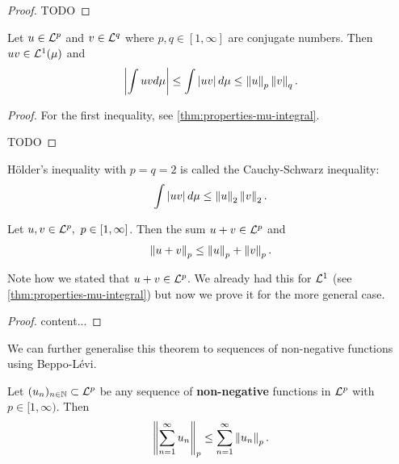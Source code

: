 \begin{proof}
	TODO
\end{proof}

\begin{thm}
	\label{thm:holder}
	Let $u \in \mathcal{L}^p$ and $v \in \mathcal{L}^q$ where $p, q \in [1,\infty]$ are conjugate numbers. Then $uv \in \mathcal{L}^1(\mu)$ and
	\begin{align}
		\left\vert{\int uv d\mu }\right\vert \leq \int \left\vert{uv}\right\vert d\mu \leq \left\Vert{u}\right\Vert_p \left\Vert{v}\right\Vert_q.
	\end{align}
\end{thm}

\begin{proof}
	For the first inequality, see \autoref{thm:properties-mu-integral}.
	
	TODO
\end{proof}

\begin{cor}
	\label{cor:cauchy-schwarz}
	Hölder's inequality with $p = q = 2$ is called the Cauchy-Schwarz inequality:
	\begin{align}
		\int \left\vert{uv}\right\vert d\mu \leq \left\Vert{u}\right\Vert_2 \left\Vert{v}\right\Vert_2.
	\end{align}
\end{cor}

\begin{thm}
	\label{thm:minkowski}
	Let $u, v \in \mathcal{L}^p,\ p \in [1, \infty]$. Then the sum $u + v \in \mathcal{L}^p$ and
	\begin{align}
		\left\Vert{u + v}\right\Vert_p \leq \left\Vert{u}\right\Vert_p + \left\Vert{v}\right\Vert_p.
	\end{align}
\end{thm}

Note how we stated that $u + v \in \mathcal{L}^p$. We already had this for $\mathcal{L}^1$ (see \autoref{thm:properties-mu-integral}) but now we prove it for the more general case.

\begin{proof}
	content...
\end{proof}

We can further generalise this theorem to sequences of non-negative functions using Beppo-Lévi.

\begin{cor}
	\label{cor:minkowski-seq}
	
	Let $(u_n)_{n\in\mathbb{N}} \subset \mathcal{L}^p$ be any sequence of \textbf{non-negative} functions in $\mathcal{L}^p$ with $p \in [1,\infty)$. Then
	\begin{align}
		\left\Vert{\sum_{n=1}^\infty u_n}\right\Vert_p
		\leq \sum_{n = 1}^\infty \left\Vert{u_n}\right\Vert_p.
	\end{align}
\end{cor}

